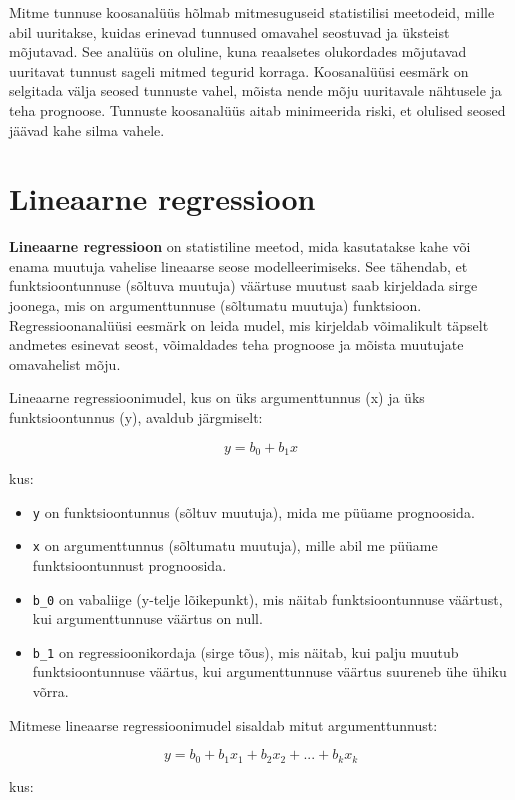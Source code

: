 \documentclass[
]{book}
\providecommand{\tightlist}{%
  \setlength{\itemsep}{0pt}\setlength{\parskip}{0pt}}
\theoremstyle{definition}
\theoremstyle{definition}
\theoremstyle{definition}
\theoremstyle{definition}
\theoremstyle{remark}
\begin{document}
Mitme tunnuse koosanalüüs hõlmab mitmesuguseid statistilisi meetodeid, mille abil uuritakse, kuidas erinevad tunnused omavahel seostuvad ja üksteist mõjutavad. See analüüs on oluline, kuna reaalsetes olukordades mõjutavad uuritavat tunnust sageli mitmed tegurid korraga. Koosanalüüsi eesmärk on selgitada välja seosed tunnuste vahel, mõista nende mõju uuritavale nähtusele ja teha prognoose. Tunnuste koosanalüüs aitab minimeerida riski, et olulised seosed jäävad kahe silma vahele.

\section{Lineaarne regressioon}\label{lineaarne-regressioon}

\textbf{Lineaarne regressioon} on statistiline meetod, mida kasutatakse kahe või enama muutuja vahelise lineaarse seose modelleerimiseks. See tähendab, et funktsioontunnuse (sõltuva muutuja) väärtuse muutust saab kirjeldada sirge joonega, mis on argumenttunnuse (sõltumatu muutuja) funktsioon. Regressioonanalüüsi eesmärk on leida mudel, mis kirjeldab võimalikult täpselt andmetes esinevat seost, võimaldades teha prognoose ja mõista muutujate omavahelist mõju.

Lineaarne regressioonimudel, kus on üks argumenttunnus (x) ja üks funktsioontunnus (y), avaldub järgmiselt:

\[y = b_0 + b_1x\]

kus:

\begin{itemize}
\tightlist
\item
  \texttt{y} on funktsioontunnus (sõltuv muutuja), mida me püüame prognoosida.
\item
  \texttt{x} on argumenttunnus (sõltumatu muutuja), mille abil me püüame funktsioontunnust prognoosida.
\item
  \texttt{b\_0} on vabaliige (y-telje lõikepunkt), mis näitab funktsioontunnuse väärtust, kui argumenttunnuse väärtus on null.
\item
  \texttt{b\_1} on regressioonikordaja (sirge tõus), mis näitab, kui palju muutub funktsioontunnuse väärtus, kui argumenttunnuse väärtus suureneb ühe ühiku võrra.
\end{itemize}

Mitmese lineaarse regressioonimudel sisaldab mitut argumenttunnust:

\[y = b_0 + b_1x_1 + b_2x_2 + ... + b_kx_k\]

kus:
\end{document}
